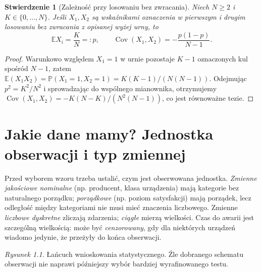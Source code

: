 \documentclass[11pt,a4paper,oneside]{report}
\numberwithin{equation}{chapter}
\theoremstyle{plain}
\newtheorem{stwierdzenie}[twierdzenie]{Stwierdzenie}
\theoremstyle{definition}
\theoremstyle{remark}
\newcommand{\Prob}{\mathbb P}
\newcommand{\E}{\mathbb E}
\newcommand{\Cov}{\operatorname{Cov}}
\begin{document}
\begin{stwierdzenie}[Zależność przy losowaniu bez zwracania]\label{prop:without-replacement-cov}
Niech $N\ge2$ i $K\in\{0,\ldots,N\}$. Jeśli $X_1,X_2$ są wskaźnikami oznaczenia w pierwszym i drugim losowaniu bez zwracania z opisanej wyżej urny, to
\[
\E X_i=\frac KN=:p,\qquad
\Cov(X_1,X_2)=-\frac{p(1-p)}{N-1}.
\]
\end{stwierdzenie}
\begin{proof}
Warunkowo względem $X_1=1$ w urnie pozostaje $K-1$ oznaczonych kul spośród $N-1$, zatem $\E(X_1X_2)=\Prob(X_1=1,X_2=1)=K(K-1)/(N(N-1))$. Odejmując $p^2=K^2/N^2$ i sprowadzając do wspólnego mianownika, otrzymujemy
$\Cov(X_1,X_2)=-K(N-K)/(N^2(N-1))$, co jest równoważne tezie.
\end{proof}

\section{Jakie dane mamy? Jednostka obserwacji i typ zmiennej}
Przed wyborem wzoru trzeba ustalić, czym jest obserwowana jednostka. \emph{Zmienne jakościowe nominalne} (np. producent, klasa urządzenia) mają kategorie bez naturalnego porządku; \emph{porządkowe} (np. poziom satysfakcji) mają porządek, lecz odległość między kategoriami nie musi mieć znaczenia liczbowego. Zmienne \emph{liczbowe dyskretne} zliczają zdarzenia; \emph{ciągłe} mierzą wielkości. Czas do awarii jest szczególną wielkością: może być \emph{cenzorowany}, gdy dla niektórych urządzeń wiadomo jedynie, że przeżyły do końca obserwacji.

\begin{center}
\end{center}
\noindent\emph{Rysunek 1.1.} Łańcuch wnioskowania statystycznego. Źle dobranego schematu obserwacji nie naprawi późniejszy wybór bardziej wyrafinowanego testu.
\end{document}
